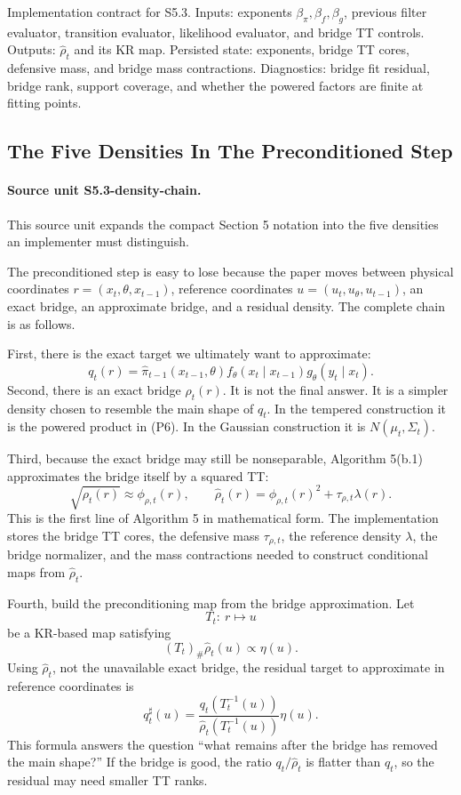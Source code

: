 \documentclass[11pt]{article}
\begin{document}
Implementation contract for S5.3.  Inputs: exponents
\(\beta_\pi,\beta_f,\beta_g\), previous filter evaluator, transition evaluator,
likelihood evaluator, and bridge TT controls.  Outputs: \(\widehat\rho_t\) and
its KR map.  Persisted state: exponents, bridge TT cores, defensive mass, and
bridge mass contractions.  Diagnostics: bridge fit residual, bridge rank,
support coverage, and whether the powered factors are finite at fitting points.

\subsection{The Five Densities In The Preconditioned Step}

\paragraph{Source unit S5.3-density-chain.}
This source unit expands the compact Section 5 notation into the five densities
an implementer must distinguish.

The preconditioned step is easy to lose because the paper moves between
physical coordinates \(r=(x_t,\theta,x_{t-1})\), reference coordinates
\(u=(u_t,u_\theta,u_{t-1})\), an exact bridge, an approximate bridge, and a
residual density.  The complete chain is as follows.

First, there is the exact target we ultimately want to approximate:
\[
    q_t(r)
    =
    \widehat\pi_{t-1}(x_{t-1},\theta)
    f_\theta(x_t\mid x_{t-1})
    g_\theta(y_t\mid x_t).
    \tag{P7a}
\]
Second, there is an exact bridge \(\rho_t(r)\).  It is not the final answer.
It is a simpler density chosen to resemble the main shape of \(q_t\).  In the
tempered construction it is the powered product in (P6).  In the Gaussian
construction it is \(N(\mu_t,\Sigma_t)\).

Third, because the exact bridge may still be nonseparable, Algorithm 5(b.1)
approximates the bridge itself by a squared TT:
\[
    \sqrt{\rho_t(r)}\approx \phi_{\rho,t}(r),
    \qquad
    \widehat\rho_t(r)
    =
    \phi_{\rho,t}(r)^2+\tau_{\rho,t}\lambda(r).
    \tag{P7b}
\]
This is the first line of Algorithm 5 in mathematical form.  The implementation
stores the bridge TT cores, the defensive mass \(\tau_{\rho,t}\), the reference
density \(\lambda\), the bridge normalizer, and the mass contractions needed to
construct conditional maps from \(\widehat\rho_t\).

Fourth, build the preconditioning map from the bridge approximation.  Let
\[
    T_t:\ r\mapsto u
    \tag{P7c}
\]
be a KR-based map satisfying
\[
    (T_t)_\#\widehat\rho_t(u)\propto \eta(u).
    \tag{P7d}
\]
Using \(\widehat\rho_t\), not the unavailable exact bridge, the residual target
to approximate in reference coordinates is
\[
    q_t^\sharp(u)
    =
    \frac{q_t(T_t^{-1}(u))}
    {\widehat\rho_t(T_t^{-1}(u))}
    \eta(u).
    \tag{P7e}
\]
This formula answers the question ``what remains after the bridge has removed
the main shape?''  If the bridge is good, the ratio \(q_t/\widehat\rho_t\) is
flatter than \(q_t\), so the residual may need smaller TT ranks.
\end{document}

